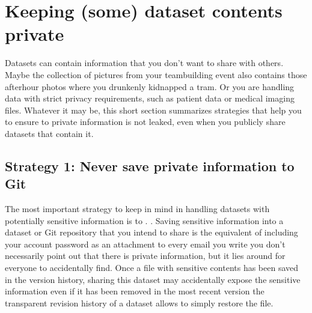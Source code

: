 \ignorespaces 
\sphinxstepscope


\section{Keeping (some) dataset contents private}
\label{\detokenize{basics/101-139-privacy:keeping-some-dataset-contents-private}}\label{\detokenize{basics/101-139-privacy:privacy}}\label{\detokenize{basics/101-139-privacy::doc}}
\sphinxAtStartPar
Datasets can contain information that you don’t want to share with others.
Maybe the collection of pictures from your team\sphinxhyphen{}building event also contains those after\sphinxhyphen{}hour photos where you drunkenly kidnapped a tram.
Or you are handling data with strict privacy requirements, such as patient data or
medical imaging files.
Whatever it may be, this short section summarizes strategies that help you to ensure
to private information is not leaked, even when you publicly share datasets that contain it.


\subsection{Strategy 1: Never save private information to Git}
\label{\detokenize{basics/101-139-privacy:strategy-1-never-save-private-information-to-git}}
\sphinxAtStartPar
The most important strategy to keep in mind in handling datasets with potentially sensitive information is to . .
Saving sensitive information into a dataset or Git repository that you intend to share is the equivalent of including your account password as an attachment to every email you write \textendash{} you don’t necessarily point out that there is private information, but it lies around for everyone to accidentally find.
Once a file with sensitive contents has been saved in the version history, sharing this dataset may accidentally expose the sensitive information even if it has been removed in the most recent version \textendash{} the transparent revision history of a dataset allows to simply restore the file.

